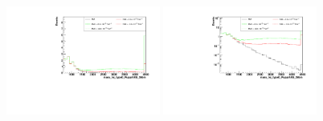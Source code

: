 \begin{figure}[h]
  \begin{center}
	\includegraphics[width=0.45\textwidth]{Plots/aQGC_kinematics/mass_lvj_type0_PuppiAK8_39bin_FM0.pdf}%
	\includegraphics[width=0.45\textwidth]{Plots/aQGC_kinematics/mass_lvj_type0_PuppiAK8_39bin_FM0_log.pdf}\\	
    \caption{}
  \end{center}
\end{figure}

